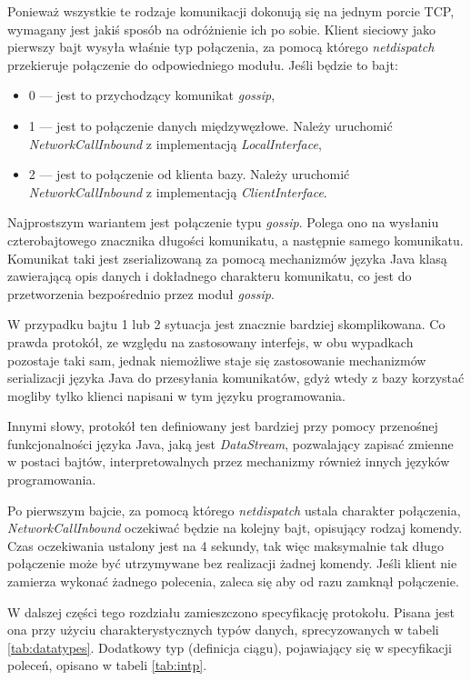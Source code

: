 \documentclass[a4paper,polish,12pt,twoside]{article}
\begin{document}
Ponieważ wszystkie te rodzaje komunikacji dokonują się na jednym porcie TCP, wymagany jest jakiś sposób na odróżnienie ich po sobie. Klient sieciowy jako pierwszy bajt wysyła właśnie typ połączenia,  za pomocą którego \textit{netdispatch} przekieruje połączenie do odpowiedniego modułu. Jeśli będzie to bajt:
	\begin{itemize}
		\item 0 --- jest to przychodzący komunikat \textit{gossip},
		\item 1 --- jest to połączenie danych międzywęzłowe. Należy uruchomić \textit{NetworkCallInbound} z implementacją \textit{LocalInterface},
		\item 2 --- jest to połączenie od klienta bazy. Należy uruchomić \textit{NetworkCallInbound} z implementacją \textit{ClientInterface}.
	\end{itemize}

Najprostszym wariantem jest połączenie typu \textit{gossip}. Polega ono na wysłaniu czterobajtowego znacznika długości komunikatu, a następnie samego komunikatu. Komunikat taki jest zserializowaną za pomocą mechanizmów języka Java klasą zawierającą opis danych i dokładnego charakteru komunikatu, co jest do przetworzenia bezpośrednio przez moduł \textit{gossip}.

W przypadku bajtu 1 lub 2 sytuacja jest znacznie bardziej skomplikowana. Co prawda protokół, ze względu na zastosowany interfejs, w obu wypadkach pozostaje taki sam, jednak niemożliwe staje się zastosowanie mechanizmów serializacji języka Java do przesyłania komunikatów, gdyż wtedy z bazy korzystać mogliby tylko klienci napisani w tym języku programowania.

Innymi słowy, protokół ten definiowany jest bardziej przy pomocy przenośnej funkcjonalności języka Java, jaką jest \textit{DataStream}, pozwalający zapisać zmienne w postaci bajtów, interpretowalnych przez mechanizmy również innych języków programowania.

Po pierwszym bajcie, za pomocą którego \textit{netdispatch} ustala charakter połączenia, \textit{NetworkCallInbound} oczekiwać będzie na kolejny bajt, opisujący rodzaj komendy. Czas oczekiwania ustalony jest na 4 sekundy, tak więc maksymalnie tak długo połączenie może być utrzymywane bez realizacji żadnej komendy. Jeśli klient nie zamierza wykonać żadnego polecenia, zaleca się aby od razu zamknął połączenie. 

W dalszej części tego rozdziału zamieszczono specyfikację protokołu. Pisana jest ona przy użyciu charakterystycznych typów danych, sprecyzowanych w tabeli \ref{tab:datatypes}. Dodatkowy typ (definicja ciągu), pojawiający się w specyfikacji poleceń, opisano w tabeli \ref{tab:intp}.
\end{document}
